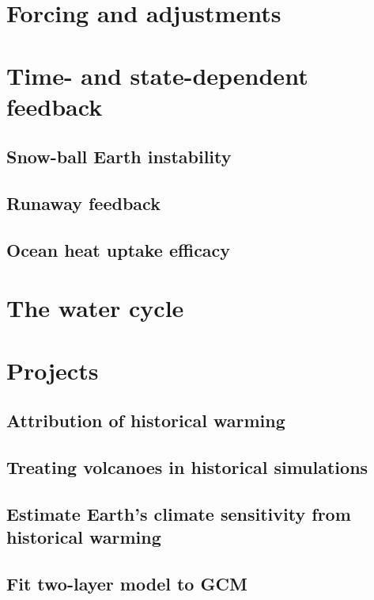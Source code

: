 \documentclass[12pt]{book}
\begin{document}
\chapter{Forcing and adjustments}

\chapter{Time- and state-dependent feedback}
\section{Snow-ball Earth instability}
\section{Runaway feedback}
\section{Ocean heat uptake efficacy}

\chapter{The water cycle}


\chapter{Projects}


\section{Attribution of historical warming}


\section{Treating volcanoes in historical simulations}


\section{Estimate Earth's climate sensitivity from historical warming}


\section{Fit two-layer model to GCM}
\end{document}
